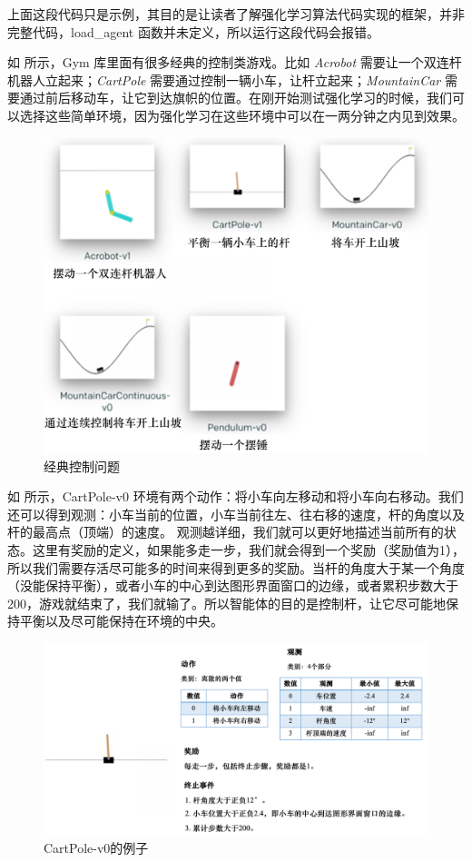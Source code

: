 \begin{tcolorbox}[colframe=blue!25,colback=blue!10]
上面这段代码只是示例，其目的是让读者了解强化学习算法代码实现的框架，并非完整代码，load\_agent 函数并未定义，所以运行这段代码会报错。
\end{tcolorbox}

如 所示，Gym 库里面有很多经典的控制类游戏。比如 \textit{Acrobot} 需要让一个双连杆机器人立起来；\textit{CartPole} 需要通过控制一辆小车，让杆立起来；\textit{MountainCar} 需要通过前后移动车，让它到达旗帜的位置。在刚开始测试强化学习的时候，我们可以选择这些简单环境，因为强化学习在这些环境中可以在一两分钟之内见到效果。

\begin{figure}[htb]
    \centering
    \includegraphics[width=0.4\linewidth]{res/ch1/1.46}
    \caption{经典控制问题}
    \label{fig:fig1.46}
\end{figure}



如 所示，CartPole-v0 环境有两个动作：将小车向左移动和将小车向右移动。我们还可以得到观测：小车当前的位置，小车当前往左、往右移的速度，杆的角度以及杆的最高点（顶端）的速度。
观测越详细，我们就可以更好地描述当前所有的状态。这里有奖励的定义，如果能多走一步，我们就会得到一个奖励（奖励值为1），所以我们需要存活尽可能多的时间来得到更多的奖励。当杆的角度大于某一个角度（没能保持平衡），或者小车的中心到达图形界面窗口的边缘，或者累积步数大于200，游戏就结束了，我们就输了。所以智能体的目的是控制杆，让它尽可能地保持平衡以及尽可能保持在环境的中央。

\begin{figure}[htb]
    \centering
    \includegraphics[width=0.5\linewidth]{res/ch1/1.47}
    \caption{CartPole-v0的例子}
    \label{fig:fig1.47}
\end{figure}


